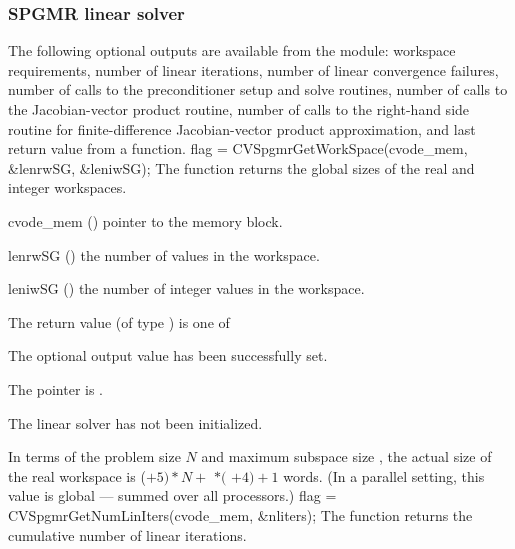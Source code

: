 \subsubsection{SPGMR linear solver}\label{sss:optout_spgmr}
The following optional outputs are available from the {\cvspgmr}
module: workspace requirements, number of linear iterations, number of
linear convergence failures, number of calls to the preconditioner
setup and solve routines, number of calls to the Jacobian-vector
product routine, number of calls to the right-hand side routine for
finite-difference Jacobian-vector product approximation, and last
return value from a {\cvspgmr} function.
{
  flag = CVSpgmrGetWorkSpace(cvode\_mem, \&lenrwSG, \&leniwSG);
}
{
  The function  returns the global sizes of the
  {\cvspgmr} real and integer workspaces.
}
{
  \begin{args}
  \item[cvode\_mem] ()
    pointer to the {\cvode} memory block.
  \item[lenrwSG] ()
    the number of  values in the {\cvspgmr} workspace.
  \item[leniwSG] ()
    the number of integer values in the {\cvspgmr} workspace.
  \end{args}
}
{
  The return value  (of type ) is one of
  \begin{args}
  \item[\Id{CVSPGMR\_SUCCESS}] 
    The optional output value has been successfully set.
  \item[\Id{CVSPGMR\_MEM\_NULL}]
    The  pointer is .
  \item[\Id{CVSPGMR\_LMEM\_NULL}]
    The {\cvspgmr} linear solver has not been initialized.
  \end{args}
}
{
  In terms of the problem size $N$ and maximum subspace size , 
  the actual size of the real workspace is
  ($+ 5)*N +$  $*($ $ + 4) + 1$ 
  words.  (In a parallel setting, this value is global --- summed over
  all processors.)
}
{
  flag = CVSpgmrGetNumLinIters(cvode\_mem, \&nliters);
}
{
  The function  returns the
  cumulative number of linear iterations.
}
